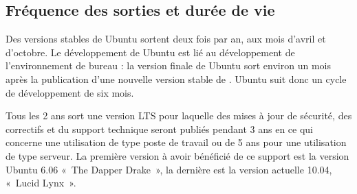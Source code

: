 \subsection{Fréquence des sorties et durée de vie}
Des versions stables de Ubuntu sortent deux fois par an, aux mois d'avril et d'octobre. Le développement de Ubuntu est lié au développement de l'environnement de bureau  : la version finale de Ubuntu sort environ un mois après la publication d'une nouvelle version stable de . Ubuntu suit donc un cycle de développement de six mois.\par
Tous les 2 ans sort une version LTS pour laquelle des mises à jour de sécurité, des correctifs et du support technique seront publiés pendant 3 ans en ce qui concerne une utilisation de type poste de travail ou de 5 ans pour une utilisation de type serveur. La première version à avoir bénéficié de ce support est la version Ubuntu 6.06 «~The Dapper Drake~», la dernière est la version actuelle 10.04, «~Lucid Lynx~».
